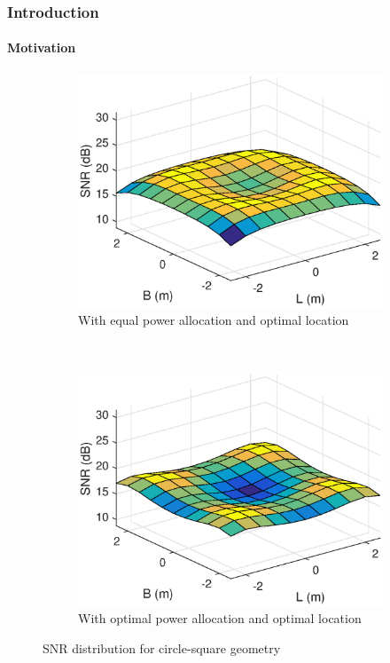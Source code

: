 \documentclass[slidestop,usepdftitle=false]{gvvslides}
\begin{document}
    
    \begin{frame}
\frametitle{Introduction}
\framesubtitle{Motivation}
\begin{figure}[h!]
    \centering
         \begin{subfigure}[t]{0.48\columnwidth}
        \centering
        \includegraphics[width=\columnwidth]{cirsqNoPowerDist_new}
        \caption{With equal power allocation and optimal location}
\label{fig2:subfig3}     
    \end{subfigure}%
~ 
    \begin{subfigure}[t]{0.48\columnwidth}
        \centering
        \includegraphics[width=\columnwidth]{cirsqPowerDist_new}
        \caption{With optimal power allocation and optimal location}
\label{fig2:subfig4}
    \end{subfigure}
    \caption{SNR distribution for circle-square geometry}
    \label{fig:SNRDistCirsq}
\end{figure}
\end{frame}
\end{document}
